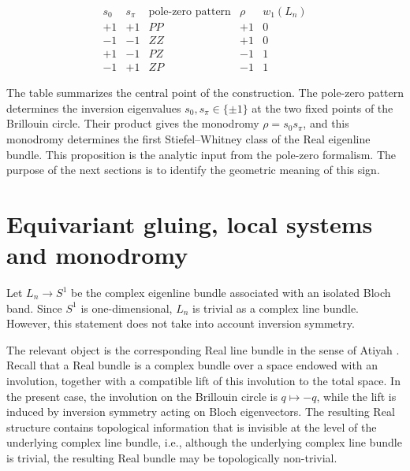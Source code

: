 \documentclass[preprint,12pt]{elsarticle}
\begin{document}
\begin{table}[h]
\centering
$$
\begin{array}{c|c|c|c|c}
s_0 & s_\pi & \text{pole-zero pattern} & \rho & w_1(L_n)\\
\hline
+1 & +1 & PP & +1 & 0\\
-1 & -1 & ZZ & +1 & 0\\
+1 & -1 & PZ & -1 & 1\\
-1 & +1 & ZP & -1 & 1
\end{array}
$$
\caption{Inversion representations at the two fixed points of the Brillouin circle and the corresponding monodromy of the Real eigenline bundle. Poles correspond to the Neumann direction and to the \(+1\) representation of inversion, while zeros correspond to the Dirichlet direction and to the \(-1\) representation.}
\end{table}
The table summarizes the central point of the construction. The pole-zero pattern determines the inversion eigenvalues $s_0,s_\pi\in \{\pm1 \}$
at the two fixed points of the Brillouin circle. Their product gives the monodromy $\rho=s_0s_\pi$,
and this monodromy determines the first Stiefel--Whitney class of the Real eigenline bundle.
This proposition is the analytic input from the pole-zero formalism. The purpose of the next sections is to identify the geometric meaning of this sign.

\section{Equivariant gluing, local systems and monodromy}

Let $L_n\longrightarrow S^1$ be the complex eigenline bundle associated with an isolated Bloch band. Since $S^1$ is one-dimensional, $L_n$ is trivial as a complex line bundle. However, this statement does not take into account inversion symmetry.

The relevant object is the corresponding Real line bundle in the sense of Atiyah \cite{atiyah}. Recall that a Real bundle is a complex bundle over a space endowed with an involution, together with a compatible lift of this involution to the total space. In the present case, the involution on the Brillouin circle is $q\mapsto -q$, while the lift is induced by inversion symmetry acting on Bloch eigenvectors. The resulting Real structure contains topological information that is invisible at the level of the underlying complex line bundle, i.e., although the underlying complex line bundle is trivial, the resulting Real bundle may be topologically non-trivial.
\end{document}
